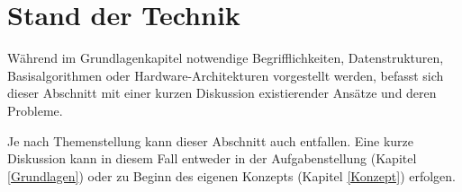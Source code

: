 
\chapter{Stand der Technik}
  \label{SOTA}
Während im Grundlagenkapitel notwendige Begrifflichkeiten, Datenstrukturen, Basisalgorithmen oder Hardware-Architekturen vorgestellt werden, befasst sich dieser Abschnitt mit einer kurzen Diskussion existierender Ansätze und deren Probleme.

Je nach Themenstellung kann dieser Abschnitt auch entfallen. Eine kurze Diskussion kann in diesem Fall entweder in der Aufgabenstellung (Kapitel \ref{Grundlagen}) oder zu Beginn des eigenen Konzepts (Kapitel \ref{Konzept}) erfolgen. 

